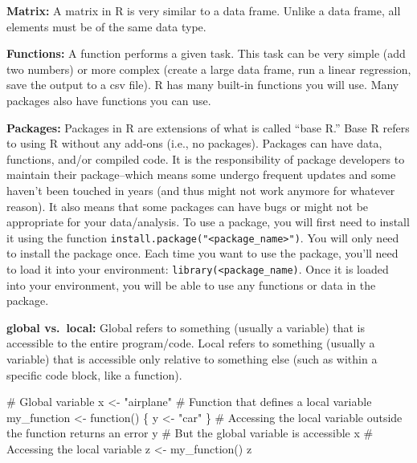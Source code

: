 \documentclass[
  letterpaper,
  DIV=11,
  numbers=noendperiod]{scrreprt}
\newenvironment{Shaded}{\begin{snugshade}}{\end{snugshade}}
\newcommand{\CommentTok}[1]{\textcolor[rgb]{0.37,0.37,0.37}{#1}}
\newcommand{\ControlFlowTok}[1]{\textcolor[rgb]{0.00,0.23,0.31}{#1}}
\newcommand{\FunctionTok}[1]{\textcolor[rgb]{0.28,0.35,0.67}{#1}}
\newcommand{\NormalTok}[1]{\textcolor[rgb]{0.00,0.23,0.31}{#1}}
\newcommand{\OtherTok}[1]{\textcolor[rgb]{0.00,0.23,0.31}{#1}}
\newcommand{\StringTok}[1]{\textcolor[rgb]{0.13,0.47,0.30}{#1}}
\begin{document}
\textbf{Matrix:} A matrix in R is very similar to a data frame. Unlike a
data frame, all elements must be of the same data type.

\textbf{Functions:} A function performs a given task. This task can be
very simple (add two numbers) or more complex (create a large data
frame, run a linear regression, save the output to a csv file). R has
many built-in functions you will use. Many packages also have functions
you can use.

\textbf{Packages:} Packages in R are extensions of what is called ``base
R.'' Base R refers to using R without any add-ons (i.e., no packages).
Packages can have data, functions, and/or compiled code. It is the
responsibility of package developers to maintain their package--which
means some undergo frequent updates and some haven't been touched in
years (and thus might not work anymore for whatever reason). It also
means that some packages can have bugs or might not be appropriate for
your data/analysis. To use a package, you will first need to install it
using the function
\texttt{install.package("\textless{}package\_name\textgreater{}")}. You
will only need to install the package once. Each time you want to use
the package, you'll need to load it into your environment:
\texttt{library(\textless{}package\_name\textquotesingle{})}. Once it is
loaded into your environment, you will be able to use any functions or
data in the package.

\textbf{global vs.~local:} Global refers to something (usually a
variable) that is accessible to the entire program/code. Local refers to
something (usually a variable) that is accessible only relative to
something else (such as within a specific code block, like a function).

\begin{Shaded}
\begin{Highlighting}[]
\CommentTok{\# Global variable}
\NormalTok{x }\OtherTok{\textless{}{-}} \StringTok{"airplane"}
\CommentTok{\# Function that defines a local variable}
\NormalTok{my\_function }\OtherTok{\textless{}{-}} \ControlFlowTok{function}\NormalTok{() \{}
\NormalTok{    y }\OtherTok{\textless{}{-}} \StringTok{"car"}
\NormalTok{\}}
\CommentTok{\# Accessing the local variable outside the function returns an error}
\NormalTok{y}
\CommentTok{\# But the global variable is accessible}
\NormalTok{x}
\CommentTok{\# Accessing the local variable }
\NormalTok{z }\OtherTok{\textless{}{-}} \FunctionTok{my\_function}\NormalTok{()}
\NormalTok{z}
\end{Highlighting}
\end{Shaded}
\end{document}
